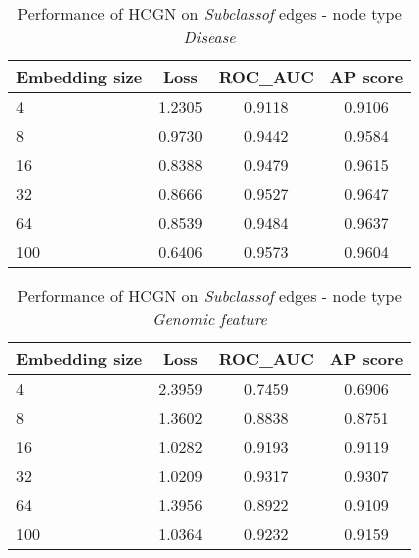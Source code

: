 \begin{table}[h]
    \centering
    \begin{tabular}{lccc}        
        \toprule
        \textbf{Embedding size} & \textbf{Loss} & \textbf{ROC\_AUC} & \textbf{AP score} \\
        \midrule
        4 & 1.2305 & 0.9118 & 0.9106 \\
        8 & 0.9730 & 0.9442 & 0.9584 \\
        16 & 0.8388 & 0.9479 & 0.9615 \\
        32 & 0.8666 & 0.9527 & 0.9647 \\
        64 & 0.8539 & 0.9484 & 0.9637 \\
        100 & 0.6406 & 0.9573 & 0.9604 \\
        \bottomrule
    \end{tabular}
    \caption{Performance of HCGN on \textit{Subclassof} edges - node type \textit{Disease}}
\end{table}

\begin{table}[h]
    \centering
    \begin{tabular}{lccc}        
        \toprule
        \textbf{Embedding size} & \textbf{Loss} & \textbf{ROC\_AUC} & \textbf{AP score} \\
        \midrule
        4 & 2.3959 & 0.7459 & 0.6906 \\
        8 & 1.3602 & 0.8838 & 0.8751 \\
        16 & 1.0282 & 0.9193 & 0.9119 \\
        32 & 1.0209 & 0.9317 & 0.9307 \\
        64 & 1.3956 & 0.8922 & 0.9109 \\
        100 & 1.0364 & 0.9232 & 0.9159 \\
        \bottomrule
    \end{tabular}
    \caption{Performance of HCGN on \textit{Subclassof} edges - node type \textit{Genomic feature}}
\end{table}


